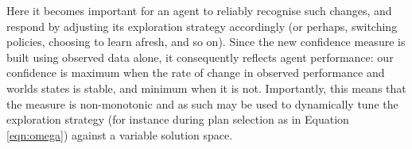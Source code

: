 Here it becomes important for an agent to reliably recognise such changes, and respond by adjusting its exploration strategy accordingly (or perhaps, switching policies, choosing to learn afresh, and so on). Since the new confidence measure is built using observed data alone, it consequently reflects agent performance: our confidence is maximum when the rate of change in observed performance and worlds states is stable, and minimum when it is not. Importantly, this means that the measure is non-monotonic and as such may be used to dynamically tune the exploration strategy (for instance during plan selection as in Equation \ref{eqn:omega}) against a variable solution space.
